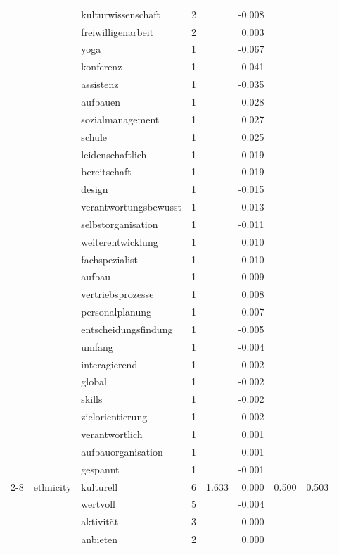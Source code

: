 \begin{longtable}{lllrrr@{\hspace{1em}}r@{\hspace{1em}}r}
 &  & kulturwissenschaft & 2 &  & -0.008 &  &  \\
 &  & freiwilligenarbeit & 2 &  & 0.003 &  &  \\
 &  & yoga & 1 &  & -0.067 &  &  \\
 &  & konferenz & 1 &  & -0.041 &  &  \\
 &  & assistenz & 1 &  & -0.035 &  &  \\
 &  & aufbauen & 1 &  & 0.028 &  &  \\
 &  & sozialmanagement & 1 &  & 0.027 &  &  \\
 &  & schule & 1 &  & 0.025 &  &  \\
 &  & leidenschaftlich & 1 &  & -0.019 &  &  \\
 &  & bereitschaft & 1 &  & -0.019 &  &  \\
 &  & design & 1 &  & -0.015 &  &  \\
 &  & verantwortungsbewusst & 1 &  & -0.013 &  &  \\
 &  & selbstorganisation & 1 &  & -0.011 &  &  \\
 &  & weiterentwicklung & 1 &  & 0.010 &  &  \\
 &  & fachspezialist & 1 &  & 0.010 &  &  \\
 &  & aufbau & 1 &  & 0.009 &  &  \\
 &  & vertriebsprozesse & 1 &  & 0.008 &  &  \\
 &  & personalplanung & 1 &  & 0.007 &  &  \\
 &  & entscheidungsfindung & 1 &  & -0.005 &  &  \\
 &  & umfang & 1 &  & -0.004 &  &  \\
 &  & interagierend & 1 &  & -0.002 &  &  \\
 &  & global & 1 &  & -0.002 &  &  \\
 &  & skills & 1 &  & -0.002 &  &  \\
 &  & zielorientierung & 1 &  & -0.002 &  &  \\
 &  & verantwortlich & 1 &  & 0.001 &  &  \\
 &  & aufbauorganisation & 1 &  & 0.001 &  &  \\
 &  & gespannt & 1 &  & -0.001 &  &  \\
\cmidrule(lr){2-8}
 & ethnicity & kulturell & 6 & 1.633 & 0.000 & 0.500 & 0.503 \\
 &  & wertvoll & 5 &  & -0.004 &  &  \\
 &  & aktivität & 3 &  & 0.000 &  &  \\
 &  & anbieten & 2 &  & 0.000 &  &  \\

\end{longtable}

